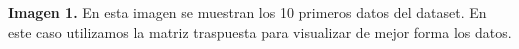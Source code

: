\documentclass[12pt]{report}
\renewcommand{\_}{\kern-1.5pt\textunderscore\kern-1.5pt}
\begin{document}
\vspace{\baselineskip}

\vspace{\baselineskip}

\vspace{\baselineskip}

\vspace{\baselineskip}

\vspace{\baselineskip}

\vspace{\baselineskip}

\vspace{\baselineskip}

\vspace{\baselineskip}

\vspace{\baselineskip}

\vspace{\baselineskip}

\vspace{\baselineskip}
\vspace{\baselineskip}
\vspace{\baselineskip}
\vspace{\baselineskip}
\vspace{\baselineskip}
\vspace{\baselineskip}
\textbf{Imagen 1.}
En esta imagen se muestran los 10 primeros datos del dataset.
En este caso utilizamos la matriz traspuesta para visualizar 
de mejor forma los datos.

\vspace{\baselineskip}


\end{document}

